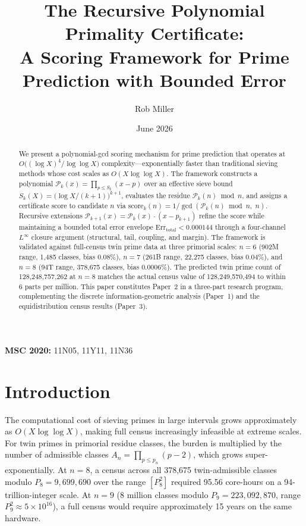 \documentclass[11pt]{article}
\title{The Recursive Polynomial Primality Certificate: \\ A Scoring Framework for Prime Prediction with Bounded Error}
\author{Rob Miller}
\date{June 2026}
\begin{document}
\maketitle

\begin{abstract}
We present a polynomial-gcd scoring mechanism for prime prediction that operates
at $O\!\bigl((\log X)^4/\log\log X\bigr)$ complexity---exponentially faster than
traditional sieving methods whose cost scales as $O(X\log\log X)$. The framework
constructs a polynomial $\mathcal{P}_k(x) = \prod_{p\le S_k}(x-p)$ over an effective
sieve bound $S_k(X) = \bigl(\log X/(k+1)\bigr)^{k+1}$, evaluates the residue
$\mathcal{P}_k(n)\bmod n$, and assigns a certificate score to candidate $n$ via
$\text{score}_k(n) = 1/\gcd(\mathcal{P}_k(n)\bmod n,\; n)$. Recursive extensions
$\mathcal{P}_{k+1}(x)=\mathcal{P}_k(x)\cdot(x-p_{k+1})$ refine the score while
maintaining a bounded total error envelope
$\text{Err}_\mathrm{total} < 0.000144$ through a four-channel $L^\infty$ closure
argument (structural, tail, coupling, and margin). The framework is validated
against full-census twin prime data at three primorial scales: $n=6$ (902M range,
1{,}485 classes, bias 0.08\%), $n=7$ (261B range, 22{,}275 classes, bias 0.04\%),
and $n=8$ (94T range, 378{,}675 classes, bias 0.0006\%). The predicted twin prime
count of 128{,}248{,}757{,}262 at $n=8$ matches the actual census value of
128{,}249{,}570{,}494 to within 6 parts per million. This paper constitutes
Paper~2 in a three-part research program, complementing the discrete
information-geometric analysis (Paper~1) and the equidistribution census results
(Paper~3).
\end{abstract}

\noindent \textbf{MSC 2020:} 11N05, 11Y11, 11N36

\section{Introduction}

The computational cost of sieving primes in large intervals grows approximately
as $O(X\log\log X)$, making full census increasingly infeasible at extreme scales.
For twin primes in primorial residue classes, the burden is multiplied by the number
of admissible classes $A_n = \prod_{p\le p_n}(p-2)$, which grows super-exponentially.
At $n=8$, a census across all 378{,}675 twin-admissible classes modulo
$P_8 = 9{,}699{,}690$ over the range $[P_8^{\!2}]$ required 95.56 core-hours on a
94-trillion-integer scale. At $n=9$ (8 million classes modulo
$P_9 = 223{,}092{,}870$, range $P_9^{\!2} \approx 5\times 10^{16}$), a full census
would require approximately 15 years on the same hardware.
\end{document}
